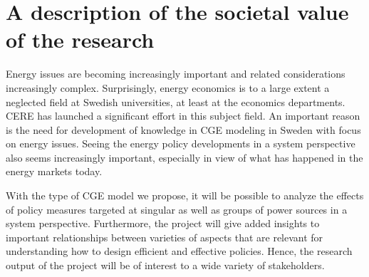 \section{A description of the societal value of the research}
Energy issues are becoming increasingly important and related considerations increasingly complex. Surprisingly, energy economics is to a large extent a neglected field at Swedish universities, at least at the economics departments. CERE has launched a significant effort in this subject field. An important reason is the need for development of knowledge in CGE modeling in Sweden with focus on energy issues. Seeing the energy policy developments in a system perspective also seems increasingly important, especially in view of what has happened in the energy markets today.

With the type of CGE model we propose, it will be possible to analyze the effects of policy measures targeted at singular as well as groups of power sources in a system perspective. Furthermore, the project will give added insights to important relationships between varieties of aspects that are relevant for understanding how to design efficient and effective policies. Hence, the research output of the project will be of interest to a wide variety of stakeholders.

